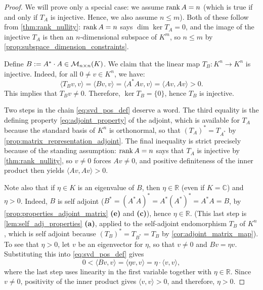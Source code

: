 \begin{proof}
We will prove only a special case: we assume $\operatorname{rank} A = n$ (which is true if and only if $T_A$ is injective. Hence, we also assume $n \le m$). Both of these follow from \cref{thm:rank_nullity}: $\operatorname{rank} A = n$ says $\dim \ker T_A = 0$, and the image of the injective $T_A$ is then an $n$-di\-men\-sional subspace of $K^m$, so $n \le m$ by \cref{prop:subspace_dimension_constraints}.

Define $B := A^* \cdot A \in \mathcal{M}_{n \times n}(K)$. We claim that the linear map $T_B \colon K^n \to K^n$ is injective.
Indeed, for all $0 \neq v \in K^n$, we have:
\begin{equation}
\label{eq:svd_pos_def}
\langle T_B v, v \rangle = \langle Bv, v \rangle = \langle A^* A v, v \rangle = \langle A v, A v \rangle > 0.
\end{equation}
This implies that $T_B v \neq 0$. Therefore, $\ker T_B = \{0\}$, hence $T_B$ is injective.

Two steps in the chain \eqref{eq:svd_pos_def} deserve a word. The third equality is the defining property \eqref{eq:adjoint_property} of the adjoint, which is available for $T_A$ because the standard basis of $K^n$ is orthonormal, so that $(T_A)^* = T_{A^*}$ by \cref{prop:matrix_representation_adjoint}. The final inequality is strict precisely because of the standing assumption: $\operatorname{rank} A = n$ says that $T_A$ is injective by \cref{thm:rank_nullity}, so $v \neq 0$ forces $Av \neq 0$, and positive definiteness of the inner product then yields $\langle Av, Av \rangle > 0$.

Note also that if $\eta \in K$ is an eigenvalue of $B$, then $\eta \in \mathbb{R}$ (even if $K = \mathbb{C}$) and $\eta > 0$.
Indeed, $B$ is self adjoint ($B^* = (A^* A)^* = A^* (A^*)^* = A^* A = B$, by \cref{prop:properties_adjoint_matrix} \textbf{(e)} and \textbf{(c)}), hence $\eta \in \mathbb{R}$. (This last step is \cref{lem:self_adj_properties} \textbf{(a)}, applied to the self-adjoint endomorphism $T_B$ of $K^n$, which is self adjoint because $(T_B)^* = T_{B^*} = T_B$ by \cref{cor:adjoint_matrix_map}). To see that $\eta > 0$, let $v$ be an eigenvector for $\eta$, so that $v \neq 0$ and $Bv = \eta v$. Substituting this into \eqref{eq:svd_pos_def} gives
\[
0 < \langle Bv, v \rangle = \langle \eta v, v \rangle = \eta \cdot \langle v, v \rangle,
\]
where the last step uses linearity in the first variable together with $\eta \in \mathbb{R}$. Since $v \neq 0$, positivity of the inner product gives $\langle v, v \rangle > 0$, and therefore, $\eta > 0$.


\end{proof}
